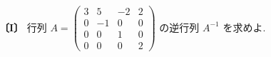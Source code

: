 \noindent\textbf{〔I〕}
行列 $A=\begin{pmatrix}
3 & 5 & -2 & 2\\
0 & -1 & 0 & 0\\
0 & 0 & 1 & 0\\
0 & 0 & 0 & 2
\end{pmatrix}$ の逆行列 $A^{-1}$ を求めよ.
